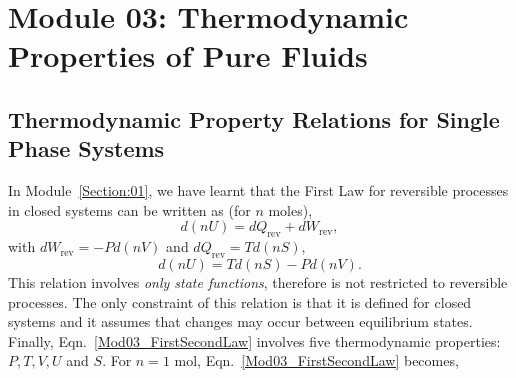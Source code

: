 \documentclass[12pts,a4paper,amsmath,amssymb,floatfix]{article}%
\begin{document}
\section{Module 03: Thermodynamic Properties of Pure Fluids}\label{Section:03}


\subsection{Thermodynamic Property Relations for Single Phase Systems}

In Module~\ref{Section:01}, we have learnt that the First Law for reversible processes in closed systems can be written as (for $n$ moles),
   \begin{equation}
       d\left(n U\right) = d Q_{\text{rev}} + d W_{\text{rev}},\label{Mod03_FirstLaw}
   \end{equation} 
with $d W_{\text{rev}} = -Pd(nV)$ and $d Q_{\text{rev}}=Td(nS)$,
   \begin{equation}
       d\left(n U\right) = T d(nS) - Pd(nV).\label{Mod03_FirstSecondLaw}
   \end{equation} 
This relation involves {\it only state functions}, therefore is not restricted to reversible processes. The only constraint of this relation is that it is defined for closed systems and it assumes that changes may occur between equilibrium states. Finally, Eqn.~\ref{Mod03_FirstSecondLaw} involves five thermodynamic properties: $P, T, V, U$ and $S$. For $n=1$ mol, Eqn.~\ref{Mod03_FirstSecondLaw} becomes,
\end{document}

